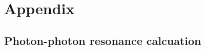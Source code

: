 
{\chapter{Appendix}}    %
\label{chap:appendix}
\setcounter{figure}{0}

\section{Photon-photon resonance calcuation}\label{sec:PP_resonance_cal}
